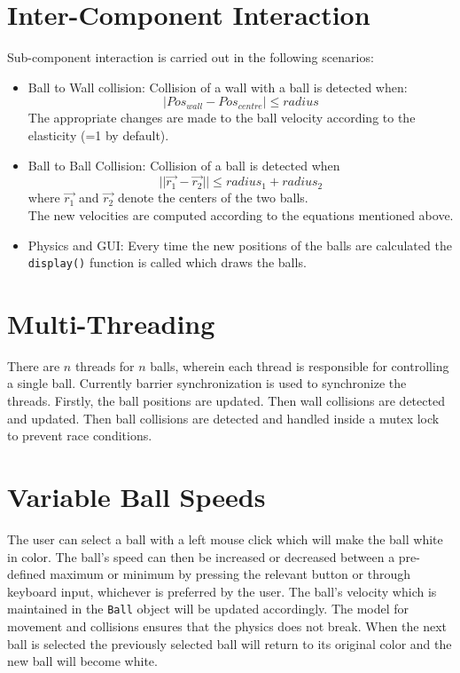 \documentclass[]{article}
\newcommand{\ty}[1]{\texttt{#1}}
\begin{document}
\section{Inter-Component Interaction}
Sub-component interaction is carried out in the following scenarios:
\begin{itemize}
\item Ball to Wall collision: Collision of a wall with a ball is detected when:
\begin{displaymath}
|Pos_{wall} - Pos_{centre}| \leq radius
\end{displaymath}
The appropriate changes are made to the ball velocity according to the elasticity (=1 by default).
\item Ball to Ball Collision: Collision of a ball is detected when
\begin{displaymath}
||\vec{r_1} - \vec{r_2}|| \leq radius_1 + radius_2
\end{displaymath}
where $\vec{r_1}$ and $\vec{r_2}$ denote the centers of the two balls.\\
The new velocities are computed according to the equations mentioned above.
\item Physics and GUI: Every time the new positions of the balls are calculated the \ty{display()} function is called which draws the balls.
\end{itemize}
\section{Multi-Threading}
There are $n$ threads for $n$ balls, wherein each thread is responsible for controlling a single ball. Currently barrier synchronization is used to synchronize the threads. Firstly, the ball positions are updated. Then wall collisions are detected and updated. Then ball collisions are detected and handled inside a mutex lock to prevent race conditions.
\section{Variable Ball Speeds}
The user can select a ball with a left mouse click which will make the ball white in color. The ball's speed can then be increased or decreased between a pre-defined maximum or minimum by pressing the relevant button or through keyboard input, whichever is preferred by the user. The ball's velocity which is maintained in the \ty{Ball} object will be updated accordingly. The model for movement and collisions ensures that the physics does not break. When the next ball is selected the previously selected ball will return to its original color and the new ball will become white.
\end{document}
